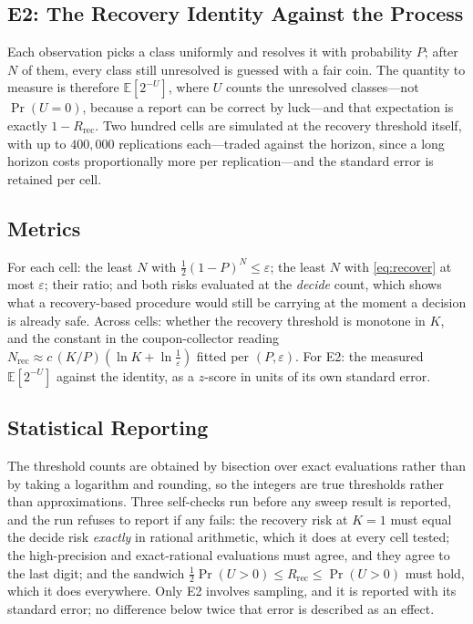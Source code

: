 \documentclass[conference]{IEEEtran}
\theoremstyle{definition}
\begin{document}
\subsection{E2: The Recovery Identity Against the Process}
\label{sec:e2}

Each observation picks a class uniformly and resolves it with probability $P$; after $N$ of
them, every class still unresolved is guessed with a fair coin. The quantity to measure is
therefore $\mathbb{E}[2^{-U}]$, where $U$ counts the unresolved classes---not
$\Pr(U=0)$, because a report can be correct by luck---and that expectation is exactly
$1-R_{\mathrm{rec}}$. Two hundred cells are simulated at the recovery threshold itself, with up to
$400{,}000$ replications each---traded against the horizon, since a long horizon costs
proportionally more per replication---and the standard error is retained per cell.

\subsection{Metrics}

For each cell: the least $N$ with $\tfrac12(1-P)^{N}\le\varepsilon$; the least $N$ with
\eqref{eq:recover} at most $\varepsilon$; their ratio; and both risks evaluated at the
\emph{decide} count, which shows what a recovery-based procedure would still be carrying at
the moment a decision is already safe. Across cells: whether the recovery threshold is
monotone in $K$, and the constant in the coupon-collector reading
$N_{\mathrm{rec}}\approx c\,(K/P)(\ln K+\ln\tfrac1\varepsilon)$ fitted per $(P,\varepsilon)$.
For E2: the measured $\mathbb{E}[2^{-U}]$ against the identity, as a $z$-score in units of its
own standard error.

\subsection{Statistical Reporting}

The threshold counts are obtained by bisection over exact evaluations rather than by taking a
logarithm and rounding, so the integers are true thresholds rather than approximations. Three
self-checks run before any sweep result is reported, and the run refuses to report if any
fails: the recovery risk at $K=1$ must equal the decide risk \emph{exactly} in rational
arithmetic, which it does at every cell tested; the high-precision and exact-rational
evaluations must agree, and they agree to the last digit; and the sandwich
$\tfrac12\Pr(U>0)\le R_{\mathrm{rec}}\le\Pr(U>0)$ must hold, which it does everywhere. Only
E2 involves sampling, and it is reported with its standard error; no difference below twice
that error is described as an effect.
\end{document}

